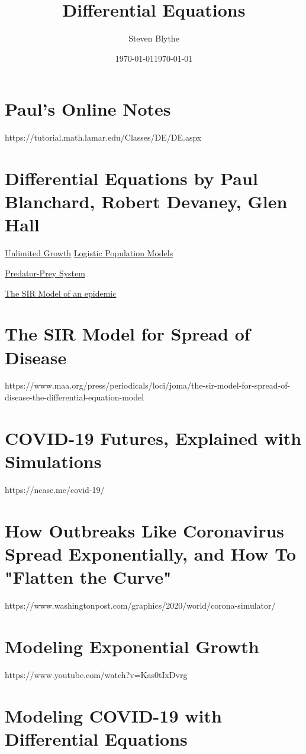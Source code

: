 \documentclass{article}
\title{Differential Equations}
\date{\today}
\author{Steven Blythe}
\date{\today}
\begin{document}
\section{Paul's Online Notes}
https://tutorial.math.lamar.edu/Classes/DE/DE.aspx\\

\section{Differential Equations by Paul Blanchard, Robert Devaney, Glen Hall}
\underline{Unlimited Growth} %
\underline{Logistic Population Models} %

\underline{Predator-Prey System} %

\underline{The SIR Model of an epidemic} %


\section{The SIR Model for Spread of Disease}
https://www.maa.org/press/periodicals/loci/joma/the-sir-model-for-spread-of-disease-the-differential-equation-model\\


\section{COVID-19 Futures, Explained with Simulations}
https://ncase.me/covid-19/\\


\section{How Outbreaks Like Coronavirus Spread Exponentially, and How To "Flatten the Curve"}
https://www.washingtonpost.com/graphics/2020/world/corona-simulator/\\


\section{Modeling Exponential Growth}
https://www.youtube.com/watch?v=Kas0tIxDvrg\\


\section{Modeling COVID-19 with Differential Equations}
\end{document}

